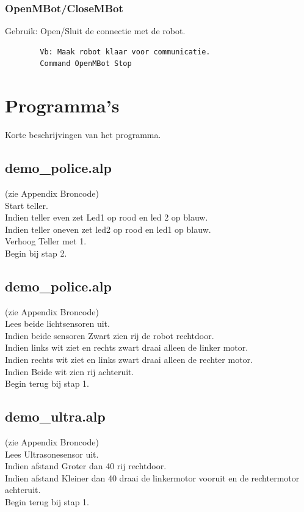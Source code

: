 \documentclass[a4paper,10pt]{article}
\begin{document}
    \subsubsection{OpenMBot/CloseMBot}
      Gebruik: Open/Sluit de connectie met de robot.
      \begin{lstlisting}
        Vb: Maak robot klaar voor communicatie.
        Command OpenMBot Stop
      \end{lstlisting}
     
    
\section{Programma's}
Korte beschrijvingen van het programma.
  \subsection{demo\_police.alp}
 (zie Appendix Broncode)\\
   Start teller.\\
   Indien teller even zet Led1 op rood en led 2 op blauw.\\
   Indien teller oneven zet led2 op rood en led1 op blauw.\\
   Verhoog Teller met 1.\\
   Begin bij stap 2.\\
  \subsection{demo\_police.alp}
  (zie Appendix Broncode)\\
  Lees beide lichtsensoren uit.\\
  Indien beide sensoren Zwart zien rij de robot rechtdoor.\\
  Indien links wit ziet en rechts zwart draai alleen de linker motor.\\
  Indien rechts wit ziet en links zwart draai alleen de rechter motor.\\
  Indien Beide wit zien rij achteruit.\\
  Begin terug bij stap 1.\\
  \subsection{demo\_ultra.alp}
 (zie Appendix Broncode)\\
  Lees Ultrasonesensor uit.\\
  Indien afstand Groter dan 40 rij rechtdoor.\\
  Indien afstand Kleiner dan 40 draai de linkermotor vooruit en de rechtermotor achteruit.\\
  Begin terug bij stap 1.\\
\end{document}
